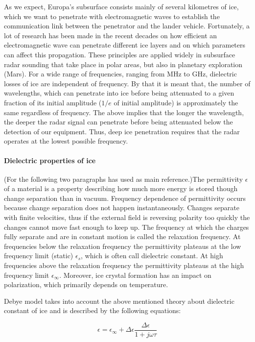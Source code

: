 As we expect, Europa's subsurface consists mainly of several kilometres of ice, which we want to penetrate with electromagnetic waves to establish the communication link between the penetrator and the lander vehicle. Fortunately, a lot of research has been made in the recent decades on how efficient an electromagnetic wave can penetrate different ice layers and on which parameters can affect this propagation. These principles are applied widely in subsurface radar sounding that take place in polar areas, but also in planetary exploration (Mars). For a wide range of frequencies, ranging from MHz to GHz, dielectric losses of ice are independent of frequency. By that it is meant that, the number of wavelengths, which can penetrate into ice before being attenuated to a given fraction of its initial amplitude ($1/e$ of initial amplitude) is approximately the same regardless of frequency. The above implies that the longer the wavelength, the deeper the radar signal can penetrate before being attenuated below the detection of our equipment. Thus, deep ice penetration requires that the radar operates at the lowest possible frequency. 

\paragraph{Dielectric properties of ice}
(For the following two paragraphs \cite{Kofman_2010} has used as main reference.)The permittivity $\epsilon$ of a material is a property describing how much more energy is stored though change separation than in vacuum. Frequency dependence of permittivity occurs because change separation does not happen instantaneously. Changes separate with finite velocities, thus if the external field is reversing polarity too quickly the changes cannot move fast enough to keep up. The frequency at which the charges fully separate and are in constant motion is called the relaxation frequency. At frequencies below the relaxation frequency the permittivity plateaus at the low frequency limit (static) $\epsilon_{s}$, which is often call dielectric constant. At high frequencies above the relaxation frequency the permittivity plateaus at the high frequency limit $\epsilon_{\infty}$. Moreover, ice crystal formation has an impact on polarization, which primarily depends on temperature.

Debye model takes into account the above mentioned theory about dielectric constant of ice and is described by the following equations: 

\begin{equation}
    \epsilon=\epsilon_{\infty}+\Delta \epsilon \frac{\Delta \epsilon}{1+j \omega \tau}
    \label{eq:dielectric}
\end{equation}

